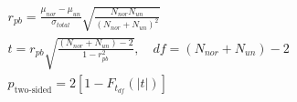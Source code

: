 ﻿\documentclass{article}
\begin{document}
\begin{preview}
\(\displaystyle
\begin{gathered}
  r_{pb}
  = \frac{\mu_{nor}-\mu_{un}}{\sigma_{total}}
  \sqrt{\frac{N_{nor}N_{un}}{(N_{nor}+N_{un})^2}} \\
  t
  = r_{pb}
  \sqrt{\frac{(N_{nor}+N_{un})-2}{1-r_{pb}^{2}}}, \quad
  df=(N_{nor}+N_{un})-2 \\
  p_{\text{two-sided}}
  = 2\left[1-F_{t_{df}}(|t|)\right]
\end{gathered}
\)
\end{preview}
\end{document}

